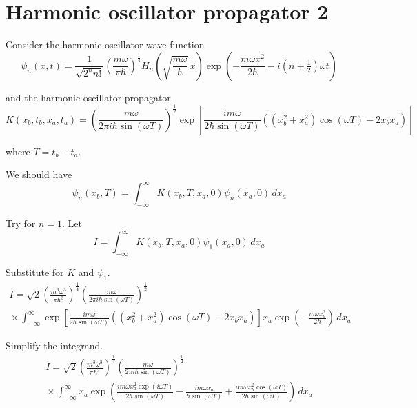 


\section*{Harmonic oscillator propagator 2}

Consider the harmonic oscillator wave function
\begin{equation*}
\psi_n(x,t)=\frac{1}{\sqrt{2^nn!}}\left(\frac{m\omega}{\pi\hbar}\right)^\frac{1}{4}
H_n\left(\sqrt{\frac{m\omega}{\hbar}}\,x\right)
\exp\left(-\frac{m\omega x^2}{2\hbar}-i\left(n+\tfrac{1}{2}\right)\omega t\right)
\end{equation*}

and the harmonic oscillator propagator
\begin{equation*}
K(x_b,t_b,x_a,t_a)
=\left(\frac{m\omega}{2\pi i\hbar\sin(\omega T)}\right)^\frac{1}{2}
\exp\left[
\frac{im\omega}{2\hbar\sin(\omega T)}
\left((x_b^2+x_a^2)\cos(\omega T)-2x_bx_a\right)
\right]
\end{equation*}

where $T=t_b-t_a$.

\bigskip
We should have
\begin{equation*}
\psi_n(x_b,T)=\int_{-\infty}^\infty K(x_b,T,x_a,0)\psi_n(x_a,0)\,dx_a
\end{equation*}

Try for $n=1$. Let
\begin{equation*}
I=\int_{-\infty}^\infty K(x_b,T,x_a,0)\psi_1(x_a,0)\,dx_a
\end{equation*}

Substitute for $K$ and $\psi_1$.
\begin{multline*}
I=\sqrt2\left(\frac{m^3\omega^3}{\pi\hbar^3}\right)^\frac{1}{4}
\left(\frac{m\omega}{2\pi i\hbar\sin(\omega T)}\right)^\frac{1}{2}
\\
{}\times
\int_{-\infty}^\infty
\exp\left[
\frac{im\omega}{2\hbar\sin(\omega T)}
\left((x_b^2+x_a^2)\cos(\omega T)-2x_bx_a\right)
\right]
x_a\exp\left(-\frac{m\omega x_a^2}{2\hbar}\right)\,dx_a
\end{multline*}

Simplify the integrand.
\begin{multline*}
I=\sqrt2\left(\frac{m^3\omega^3}{\pi\hbar^3}\right)^\frac{1}{4}
\left(\frac{m\omega}{2\pi i\hbar\sin(\omega T)}\right)^\frac{1}{2}
\\
{}\times
\int_{-\infty}^\infty x_a\exp\left(
\frac{im\omega x_a^2\exp(i\omega T)}{2\hbar\sin(\omega T)}
-\frac{im\omega x_a}{\hbar\sin(\omega T)}
+\frac{im\omega x_b^2\cos(\omega T)}{2\hbar\sin(\omega T)}
\right)\,dx_a
\end{multline*}


